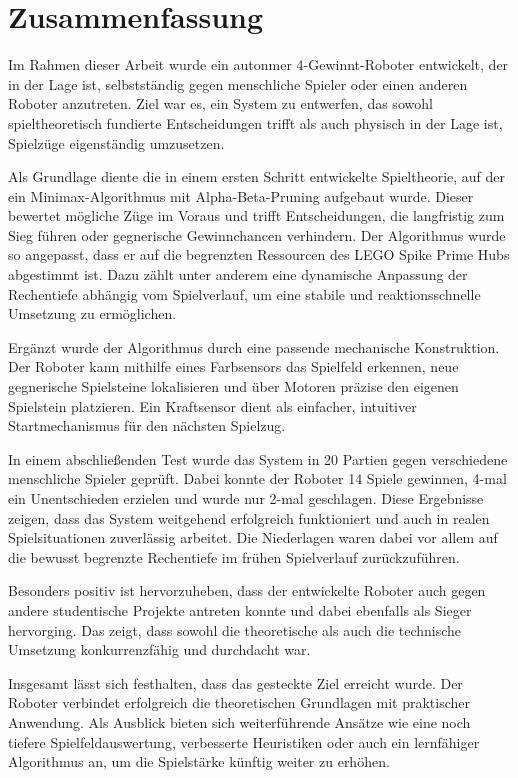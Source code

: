 \chapter{Zusammenfassung}
\label{cha:zusammenfassung}

Im Rahmen dieser Arbeit wurde ein autonmer 4-Gewinnt-Roboter entwickelt, der in der Lage ist, selbstständig gegen menschliche Spieler oder einen anderen Roboter anzutreten. Ziel war es, ein System zu entwerfen, das sowohl spieltheoretisch fundierte Entscheidungen trifft als auch physisch in der Lage ist, Spielzüge eigenständig umzusetzen.

Als Grundlage diente die in einem ersten Schritt entwickelte Spieltheorie, auf der ein Minimax-Algorithmus mit Alpha-Beta-Pruning aufgebaut wurde. Dieser bewertet mögliche Züge im Voraus und trifft Entscheidungen, die langfristig zum Sieg führen oder gegnerische Gewinnchancen verhindern. Der Algorithmus wurde so angepasst, dass er auf die begrenzten Ressourcen des LEGO Spike Prime Hubs abgestimmt ist. Dazu zählt unter anderem eine dynamische Anpassung der Rechentiefe abhängig vom Spielverlauf, um eine stabile und reaktionsschnelle Umsetzung zu ermöglichen.

Ergänzt wurde der Algorithmus durch eine passende mechanische Konstruktion. Der Roboter kann mithilfe eines Farbsensors das Spielfeld erkennen, neue gegnerische Spielsteine lokalisieren und über Motoren präzise den eigenen Spielstein platzieren. Ein Kraftsensor dient als einfacher, intuitiver Startmechanismus für den nächsten Spielzug.

In einem abschließenden Test wurde das System in 20 Partien gegen verschiedene menschliche Spieler geprüft. Dabei konnte der Roboter 14 Spiele gewinnen, 4-mal ein Unentschieden erzielen und wurde nur 2-mal geschlagen. Diese Ergebnisse zeigen, dass das System weitgehend erfolgreich funktioniert und auch in realen Spielsituationen zuverlässig arbeitet. Die Niederlagen waren dabei vor allem auf die bewusst begrenzte Rechentiefe im frühen Spielverlauf zurückzuführen.

Besonders positiv ist hervorzuheben, dass der entwickelte Roboter auch gegen andere studentische Projekte antreten konnte und dabei ebenfalls als Sieger hervorging. Das zeigt, dass sowohl die theoretische als auch die technische Umsetzung konkurrenzfähig und durchdacht war.

Insgesamt lässt sich festhalten, dass das gesteckte Ziel erreicht wurde. Der Roboter verbindet erfolgreich die theoretischen Grundlagen mit praktischer Anwendung. Als Ausblick bieten sich weiterführende Ansätze wie eine noch tiefere Spielfeldauswertung, verbesserte Heuristiken oder auch ein lernfähiger Algorithmus an, um die Spielstärke künftig weiter zu erhöhen.

